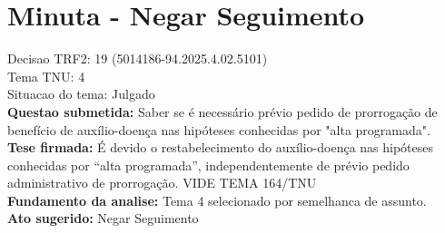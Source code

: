 \documentclass{article}
\begin{document}
\section*{Minuta - Negar Seguimento}
Decisao TRF2: 19 (5014186-94.2025.4.02.5101)\\
Tema TNU: 4\\
Situacao do tema: Julgado\\
\textbf{Questao submetida:} Saber se é necessário prévio pedido de prorrogação de benefício de auxílio-doença nas hipóteses conhecidas por "alta programada".\\
\textbf{Tese firmada:} É devido o restabelecimento do auxílio-doença nas hipóteses conhecidas por “alta programada”, independentemente de prévio pedido administrativo de prorrogação. VIDE TEMA 164/TNU\\
\textbf{Fundamento da analise:} Tema 4 selecionado por semelhanca de assunto.\\
\textbf{Ato sugerido:} Negar Seguimento
\end{document}
